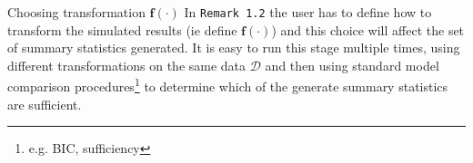 \documentclass[11pt,a4paper]{article}
\begin{document}
  \begin{remark}{Choosing transformation $\mathbf{f}(\cdot)$}
    In \texttt{Remark 1.2}  the user has to define how to transform the simulated results (ie define $\mathbf{f}(\cdot)$) and this choice will affect the set of summary statistics generated. It is easy to run this stage multiple times, using different transformations on the same data $\mathcal{D}$ and then using standard model comparison procedures\footnote{e.g. BIC, sufficiency} to determine which of the generate summary statistics are sufficient.
  \end{remark}

\newpage


\end{document}
